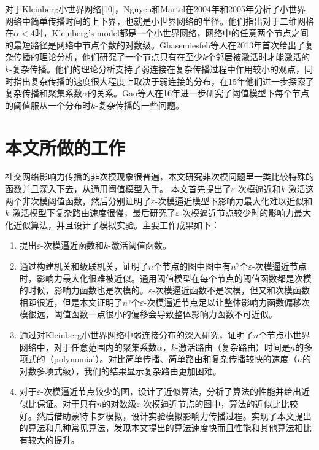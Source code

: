 对于Kleinberg小世界网络[10]，Nguyen和Martel在2004年\cite{Martel2004analyzing}和2005年\cite{Nguyen2005analyzing}分析了小世界网络中简单传播时间的上下界，也就是小世界网络的半径。他们指出对于二维网格在$\alpha<4$时，Kleinberg’s model都是一个小世界网络，网络中的任意两个节点之间的最短路径是网络中节点个数的对数级。Ghasemiesfeh等人\cite{Ghasemiesfeh2013complex}在2013年首次给出了复杂传播的理论分析，他们研究了一个节点只有在至少$k$个邻居被激活时才能激活的$k$-复杂传播。他们的理论分析支持了弱连接在复杂传播过程中作用较小的观点，同时指出复杂传播的速度很大程度上取决于弱连接的分布，在15年\cite{ebrahimi2015complex}他们进一步探索了复杂传播和聚集系数$\alpha$的关系。Gao等人在16年\cite{gao2016gt}进一步研究了阈值模型下每个节点的阈值服从一个分布时$k$-复杂传播的一些问题。




\section{本文所做的工作}
社交网络影响力传播的非次模现象很普遍，本文研究非次模问题里一类比较特殊的函数并且深入下去，从通用阈值模型入手。
本文首先提出了$\varepsilon$-次模逼近和$k$-激活这两个非次模阈值函数，然后分别证明了$\varepsilon$-次模逼近模型下影响力最大化难以近似和$k$-激活模型下复杂路由速度很慢，最后研究了$\varepsilon$-次模逼近节点较少时的影响力最大化近似算法，并且设计了模拟实验。主要工作成果如下：


\begin{enumerate}
\item  提出$\varepsilon$-次模逼近函数和$k$-激活阈值函数。
\item  通过构建机关和级联机关，证明了$n$个节点的图中图中有$n^{\gamma}$个$\varepsilon$-次模逼近节点时，影响力最大化很难被近似。通用阈值模型在每个节点的阈值函数都是次模的时候，影响力函数也是次模的\cite{Mossel2007sub}。$\varepsilon$-次模逼近函数不是次模，但又和次模函数相距很近，但是本文证明了$n^{\gamma}$个$\varepsilon$-次模逼近节点足以让整体影响力函数偏移次模很远，阈值函数一点很小的偏移会导致整体影响力函数不可近似。
\item  通过对Kleinberg小世界网络中弱连接分布的深入研究，证明了$n$个节点小世界网络中，对于任意范围内的聚集系数$\alpha$，$k$-激活路由（复杂路由）时间是$n$的多项式的（polynomial）。对比简单传播、简单路由和复杂传播较快的速度（$n$的对数多项式级），我们的结果显示复杂路由更加困难。
\item  对于$\varepsilon$-次模逼近节点较少的图，设计了近似算法，分析了算法的性能并给出近似比保证。对于只有$n$的对数级$\varepsilon$-次模逼近节点的图中，算法的近似比比较好。然后借助蒙特卡罗模拟，设计实验模拟影响力传播过程。实现了本文提出的算法和几种常见算法，发现本文提出的算法速度快而且性能和其他算法相比有较大的提升。
\end{enumerate}

